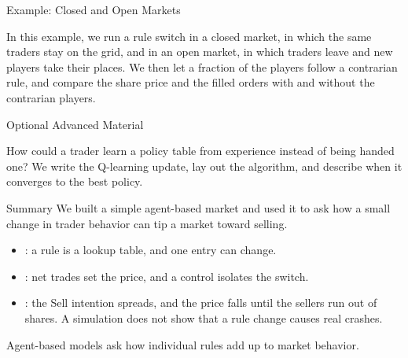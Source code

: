 \documentclass[aspectratio=169,11pt]{beamer}
\newcommand{\repo}{https://github.com/varnerlab/CHEME-5660-CourseRepository-Fall-2026/blob/main/lectures/week-12/L12b}
\begin{document}
\begin{frame}{Example: Closed and Open Markets}
  \vspace{0.3em}
  {\normalsize\textbf{}\par\small
  \href{\repo/CHEME-5660-L12b-Example-Wolfram-Viewport-Fall-2026.ipynb}{}}

  \vspace{0.8em}
  In this example, we run a rule switch in a closed market, in which the same
  traders stay on the grid, and in an open market, in which traders leave and new
  players take their places. We then let a fraction of the players follow a
  contrarian rule, and compare the share price and the filled orders with and
  without the contrarian players.
\end{frame}

\begin{frame}{Optional Advanced Material}
  \vspace{0.4em}
  {\normalsize\textbf{} \par
  \href{\repo/advanced/qlearning/CHEME-5660-L12b-Advanced-QLearning-Fall-2026.ipynb}{}}

  \vspace{0.6em}
  How could a trader learn a policy table from experience instead of being handed
  one? We write the Q-learning update, lay out the algorithm, and describe when
  it converges to the best policy.
\end{frame}

\begin{frame}{Summary}
  \vspace{0.3em}
  We built a simple agent-based market and used it to ask how a small change in
  trader behavior can tip a market toward selling.

  \vspace{0.4em}
  {\large\textbf{}}
  \begin{itemize}\setlength{\itemsep}{0.4em}
    \item {}: a rule is a lookup table, and one entry can
      change.
    \item {}: net trades set the price, and a control
      isolates the switch.
    \item {}: the Sell intention spreads, and the price
      falls until the sellers run out of shares. A simulation does not show that a
      rule change causes real crashes.
  \end{itemize}
  \vspace{0.3em}
  Agent-based models ask how individual rules add up to market behavior.
\end{frame}
\end{document}
